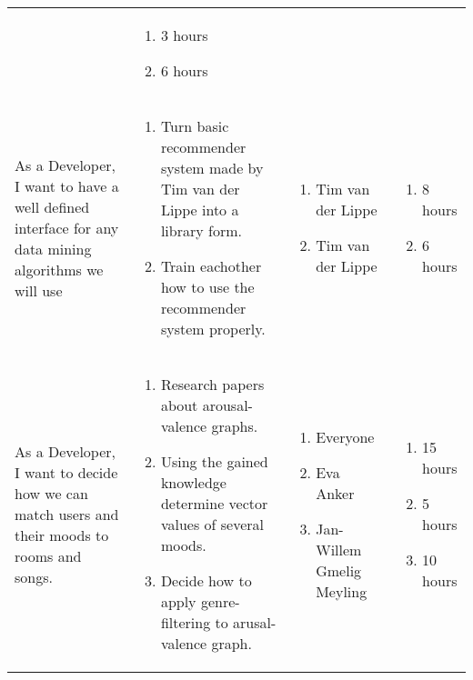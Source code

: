 \documentclass[11pt,a4paper]{article}
\begin{document}
\begin{table}[h]
\begin{tabular}{|p{4.5cm}|p{7cm}|p{4cm}|p{2.6cm}|}
& 
\begin{enumerate}
\item 3 hours
\item 6 hours
\end{enumerate} \\

As a Developer, I want to have a well defined interface for any data mining algorithms we will use & \begin{enumerate}
\item Turn basic recommender system made by Tim van der Lippe into a library form.
\item Train eachother how to use the recommender system properly.
\end{enumerate}

& 
\begin{enumerate}
\item Tim van der Lippe
\item Tim van der Lippe
\end{enumerate}

& 
\begin{enumerate}
\item 8 hours
\item 6 hours
\end{enumerate} \\

As a Developer, I want to decide how we can match users and their moods to rooms and songs. & \begin{enumerate}
\item Research papers about arousal-valence graphs.
\item Using the gained knowledge determine vector values of several moods.
\item Decide how to apply genre-filtering to arusal-valence graph.
\end{enumerate}

& 
\begin{enumerate}
\item Everyone
\item Eva Anker
\item Jan-Willem Gmelig Meyling
\end{enumerate}

& 
\begin{enumerate}
\item 15 hours
\item 5 hours
\item 10 hours
\end{enumerate} \\
           
\end{tabular}
\end{table}
\end{document}
